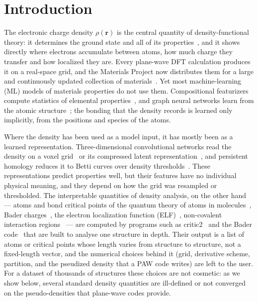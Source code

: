 \documentclass[11pt,a4paper]{article}
\begin{document}
\section{Introduction}
\label{sec:intro}
The electronic charge density $\rho(\mathbf{r})$ is the central quantity of
density-functional theory: it determines the ground state and all of its
properties~\cite{hohenberg1964}, and it shows directly where electrons
accumulate between atoms, how much charge they transfer and how localized
they are. Every plane-wave DFT calculation produces it on a real-space grid,
and the Materials Project now distributes them for a large and continuously
updated collection of materials~\cite{shen2022}. Yet most machine-learning (ML) models of materials
properties do not use them. Compositional featurizers compute statistics of
elemental properties~\cite{ward2016,ward2018}, and graph neural networks learn
from the atomic structure~\cite{xie2018,chen2019,choudhary2021}; the bonding
that the density records is learned only implicitly, from the positions and
species of the atoms.

Where the density has been used as a model input, it has mostly been as a
learned representation. Three-dimensional convolutional networks read the
density on a voxel grid~\cite{kajita2017,zhao2020} or its compressed latent
representation~\cite{kumar2026}, and persistent homology reduces it to Betti
curves over density thresholds~\cite{szymanski2025}. These representations
predict properties well, but their features have no individual physical
meaning, and they depend on how the grid was resampled or thresholded. The
interpretable quantities of density analysis, on the other hand --- atoms and
bond critical points of the quantum theory of atoms in
molecules~\cite{bader1990}, Bader charges~\cite{henkelman2006}, the electron
localization function (ELF)~\cite{becke1990}, non-covalent interaction
regions~\cite{johnson2010} --- are computed by programs such as
critic2~\cite{oterodelaroza2014} and the Bader code~\cite{henkelman2006} that
are built to analyse one structure in depth. Their output is a list of atoms
or critical points whose length varies from structure to structure, not a
fixed-length vector, and the numerical choices behind it (grid, derivative
scheme, partition, and the pseudized density that a PAW code writes) are left
to the user. For a dataset of thousands of structures these choices are not
cosmetic: as we show below, several standard density quantities are
ill-defined or not converged on the pseudo-densities that plane-wave codes
provide.
\end{document}
